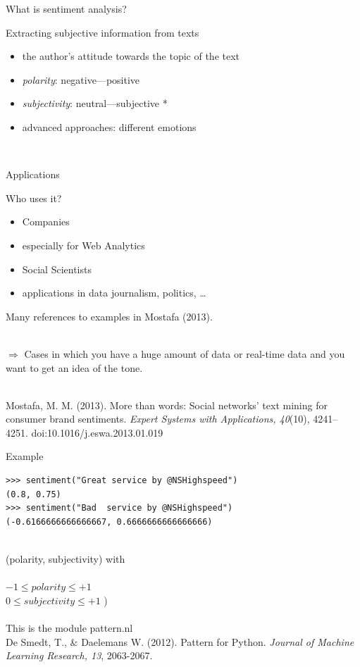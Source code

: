 \documentclass{beamer}
\begin{document}
\begin{frame}{What is sentiment analysis?}
\begin{block}{Extracting subjective information from texts}
\begin{itemize}
\item<2->  the author's attitude towards the topic of the text
\item<3-> \emph{polarity}: negative---positive
\item<4-> \emph{subjectivity}: neutral---subjective *
\item<5-> advanced approaches: different emotions
\end{itemize}
~\\ 
\footnotesize{
}
\end{block}
\end{frame}



\begin{frame}{Applications}
\begin{block}{Who uses it?}
\begin{itemize}
\item Companies
\item especially for Web Analytics
\item Social Scientists
\item applications in data journalism, politics, \ldots
\end{itemize}
Many references to examples in Mostafa (2013).
\end{block}
~\\
$\Rightarrow$ Cases in which you have a huge amount of data or real-time data and you want to get an idea of the tone. \\ ~
\par
\tiny{Mostafa, M. M. (2013). More than words: Social networks’ text mining for consumer brand sentiments. \emph{Expert Systems with Applications, 40}(10), 4241– 4251. doi:10.1016/j.eswa.2013.01.019}\\
\end{frame}


\begin{frame}[fragile]{Example}
\begin{lstlisting}
>>> sentiment("Great service by @NSHighspeed")
(0.8, 0.75)
>>> sentiment("Bad  service by @NSHighspeed")
(-0.6166666666666667, 0.6666666666666666)
\end{lstlisting}
~\\
\footnotesize{(polarity, subjectivity) with \\ ~ \\
 $-1 \leq polarity \leq +1$\\
 $0 \leq subjectivity \leq +1$ )} \\~\\
\vskip 1cm 
\tiny{This is the module pattern.nl \\ De Smedt, T., \& Daelemans W. (2012).  Pattern for Python. \emph{Journal of Machine Learning Research, 13}, 2063-2067.\\}
\end{frame}
\end{document}
